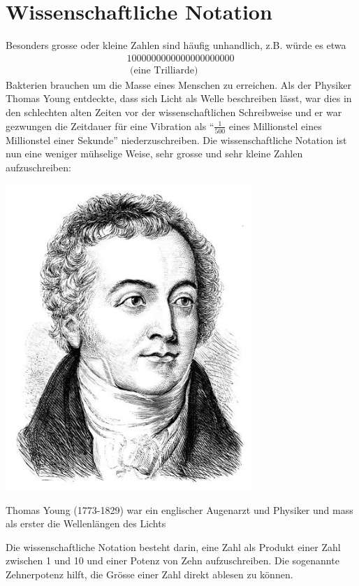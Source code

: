 \section{Wissenschaftliche Notation}
Besonders grosse oder kleine Zahlen sind häufig unhandlich, z.B. würde es etwa
\[ 
    \begin{split}
        \SI{1 000 000 000 000 000 000 000}{} \\
        \text{ (eine Trilliarde)} 
    \end{split}
\]
Bakterien brauchen um die Masse eines Menschen zu erreichen. Als der Physiker Thomas Young entdeckte, dass sich Licht als Welle beschreiben lässt, war dies in den schlechten alten Zeiten vor der wissenschaftlichen Schreibweise und er war gezwungen die Zeitdauer für eine Vibration als ``$\frac{1}{500}$ eines Millionstel eines Millionstel einer Sekunde'' niederzuschreiben. Die wissenschaftliche Notation ist nun eine weniger mühselige Weise, sehr grosse und sehr kleine Zahlen aufzuschreiben:
\begin{marginfigure}
    \includegraphics[width=0.7\textwidth]{Bilder/thomas_young.jpg}
    \label{fig:young}
    \caption{Thomas Young (1773-1829) war ein englischer Augenarzt und Physiker und mass als erster die Wellenlängen des Lichts}
\end{marginfigure}

Die wissenschaftliche Notation besteht darin, eine Zahl als Produkt einer Zahl zwischen 1 und 10 und einer Potenz von Zehn aufzuschreiben. Die sogenannte Zehnerpotenz hilft, die Grösse einer Zahl direkt ablesen zu können. 

